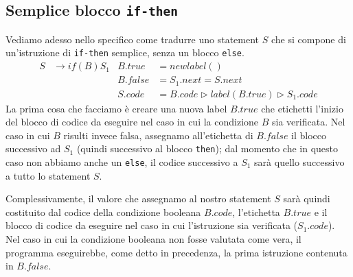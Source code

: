 \documentclass[class=book, crop=false, oneside, 12pt]{standalone}
\begin{document}
\subsection{Semplice blocco \texttt{if-then}}
Vediamo adesso nello specifico come tradurre uno statement \(S\) che si compone di un'istruzione di \texttt{if-then} semplice, senza un blocco \texttt{else}.
\begin{align*}
    S &\to if (B) S_1 & B.true &= newlabel() \\
    & & B.false &= S_1.next = S.next \\
    & & S.code &= B.code \triangleright label(B.true) \triangleright S_1.code
\end{align*}
La prima cosa che facciamo è creare una nuova label \(B.true\) che etichetti l'inizio del blocco di codice da eseguire nel caso in cui la condizione \(B\) sia verificata. Nel caso in cui \(B\) risulti invece falsa, assegnamo all'etichetta di \(B.false\) il blocco successivo ad \(S_1\) (quindi successivo al blocco \texttt{then}); dal momento che in questo caso non abbiamo anche un \texttt{else}, il codice successivo a \(S_1\) sarà quello successivo a tutto lo statement \(S\).

Complessivamente, il valore che assegnamo al nostro statement \(S\) sarà quindi costituito dal codice della condizione booleana \(B.code\), l'etichetta \(B.true\) e il blocco di codice da eseguire nel caso in cui l'istruzione sia verificata (\(S_1.code\)). Nel caso in cui la condizione booleana non fosse valutata come vera, il programma eseguirebbe, come detto in precedenza, la prima istruzione contenuta in \(B.false\). 
\end{document}
